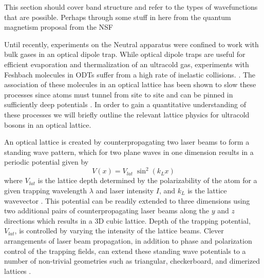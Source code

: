 This section should cover band structure and refer to the types of wavefunctions that are possible. Perhaps through some stuff in here from the quantum magnetism proposal from the NSF 

Until recently, experiments on the Neutral apparatus were confined to work with bulk gases in an optical dipole trap. While optical dipole traps are useful for efficient evaporation and thermalization of an ultracold gas, experiments with Feshbach molecules in ODTs suffer from a high rate of inelastic collisions. \cite{Kohler2006}. The association of these molecules in an optical lattice has been shown to slow these processes since atoms must tunnel from site to site and can be pinned in sufficiently deep potentials \cite{Thalhammer2006,Syassen2007}. In order to gain a quantitative understanding of these processes we will briefly outline the relevant lattice physics for ultracold bosons in an optical lattice.

An optical lattice is created by counterpropagating two laser beams to form a standing wave pattern, which for two plane waves in one dimension results in a periodic potential given by 
	\begin{equation}
		 V(x) = V_{lat} \; \sin^2(k_L x)
	\end{equation}
where $V_{lat}$ is the lattice depth determined by the polarizability of the atom for a given trapping wavelength $\lambda$ and laser intensity $I$, and $k_L$ is the lattice wavevector . This potential can be readily extended to three dimensions using two additional pairs of counterpropagating laser beams along the $y$ and $z$ directions which results in a 3D cubic lattice. Depth of the trapping potential, $V_{lat}$, is controlled by varying the intensity of the lattice beams. Clever arrangements of laser beam propagation, in addition to phase and polarization control of the trapping fields, can extend these standing wave potentials to a number of non-trivial geometries such as triangular, checkerboard, and dimerized lattices \cite{Greiner2003}.

